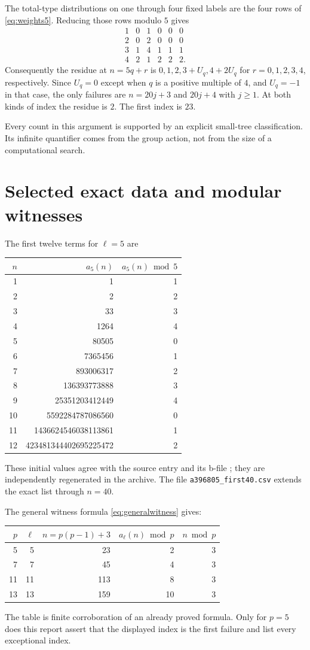 \documentclass[11pt,letterpaper]{article}
\theoremstyle{definition}
\theoremstyle{remark}
\begin{document}
The total-type distributions on one through four fixed labels are the
four rows of \eqref{eq:weights5}. Reducing those rows modulo $5$ gives
\[
 \begin{array}{c|rrrrr}
 1&0&1&0&0&0\\
 2&0&2&0&0&0\\
 3&1&4&1&1&1\\
 4&2&1&2&2&2.
 \end{array}
\]
Consequently the residue at $n=5q+r$ is $0,1,2,3+U_q,4+2U_q$ for
$r=0,1,2,3,4$, respectively. Since $U_q=0$ except when $q$ is a positive
multiple of $4$, and $U_q=-1$ in that case, the only failures are
$n=20j+3$ and $20j+4$ with $j\ge1$. At both kinds of index the residue
is $2$. The first index is $23$.

Every count in this argument is supported by an explicit small-tree
classification. Its infinite quantifier comes from the group action,
not from the size of a computational search.

\section{Selected exact data and modular witnesses}
The first twelve terms for $\ell=5$ are
\begin{center}\small
\begin{tabular}{@{}rrr@{}}
\toprule
$n$&$a_5(n)$&$a_5(n)\bmod5$\\\midrule
1&1&1\\
2&2&2\\
3&33&3\\
4&1264&4\\
5&80505&0\\
6&7365456&1\\
7&893006317&2\\
8&136393773888&3\\
9&25351203412449&4\\
10&5592284787086560&0\\
11&1436624546038113861&1\\
12&423481344402695225472&2\\
\bottomrule
\end{tabular}
\end{center}
These initial values agree with the source entry and its b-file
\cite{oeis5,bfile5}; they are independently regenerated in the archive.
The file \texttt{a396805\_first40.csv} extends the exact list through
$n=40$.

The general witness formula \eqref{eq:generalwitness} gives:
\begin{center}
\begin{tabular}{@{}rrrrr@{}}
\toprule
$p$&$\ell$&$n=p(p-1)+3$&$a_\ell(n)\bmod p$&$n\bmod p$\\\midrule
5&5&23&2&3\\
7&7&45&4&3\\
11&11&113&8&3\\
13&13&159&10&3\\
\bottomrule
\end{tabular}
\end{center}
The table is finite corroboration of an already proved formula. Only
for $p=5$ does this report assert that the displayed index is the first
failure and list every exceptional index.
\end{document}
